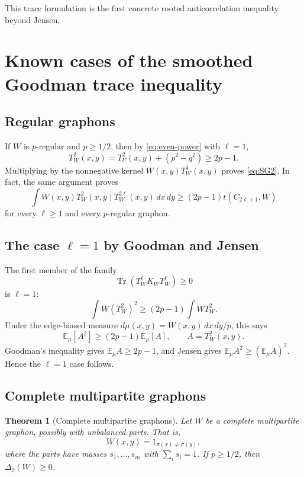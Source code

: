 \documentclass[11pt]{article}
\newtheorem{theorem}{Theorem}[section]
\theoremstyle{definition}
\newcommand{\E}{\mathbb E}
\newcommand{\Tr}{\operatorname{Tr}}
\begin{document}
This trace formulation is the first concrete rooted anticorrelation inequality beyond Jensen.

\section{Known cases of the smoothed Goodman trace inequality}

\subsection{Regular graphons}

If $W$ is $p$-regular and $p\ge1/2$, then by \eqref{eq:even-power} with $\ell=1$,
\[
  T_W^2(x,y)=T_U^2(x,y)+(p^2-q^2)
  \ge 2p-1.
\]
Multiplying by the nonnegative kernel $W(x,y)T_W^4(x,y)$ proves \eqref{eq:SG2}.  In fact, the same argument proves
\[
  \int W(x,y)T_W^2(x,y)T_W^{2\ell}(x,y)\,dx\,dy
  \ge (2p-1)t(C_{2\ell+1},W)
\]
for every $\ell\ge1$ and every $p$-regular graphon.

\subsection{The case $\ell=1$ by Goodman and Jensen}

The first member of the family
\[
  \Tr(T_W^\ell K_WT_W^\ell)\ge0
\]
is $\ell=1$:
\[
  \int W(T_W^2)^2\ge (2p-1)\int WT_W^2.
\]
Under the edge-biased measure $d\mu(x,y)=W(x,y)\,dx\,dy/p$, this says
\[
  \E_\mu[A^2]\ge (2p-1)\E_\mu[A],
  \qquad A=T_W^2(x,y).
\]
Goodman's inequality gives $\E_\mu A\ge2p-1$, and Jensen gives $\E_\mu A^2\ge(\E_\mu A)^2$.  Hence the $\ell=1$ case follows.

\subsection{Complete multipartite graphons}

\begin{theorem}[Complete multipartite graphons]\label{thm:multipartite-SG2}
Let $W$ be a complete multipartite graphon, possibly with unbalanced parts.  That is,
\[
  W(x,y)=1_{\sigma(x)\ne\sigma(y)},
\]
where the parts have masses $s_1,\dots,s_m$ with $\sum_i s_i=1$.  If $p\ge1/2$, then $\Delta_2(W)\ge0$.
\end{theorem}
\end{document}
